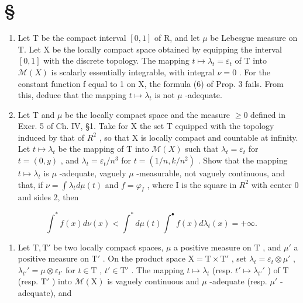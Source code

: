 \section*{\texorpdfstring{\S\CurrentExerciseGroup}{Section \CurrentExerciseGroup}}
{}

\begin{enumerate}
\def\labelenumi{\arabic{enumi})}
\item
  Let T be the compact interval \([0,1]\) of R, and let \(\mu\) be Lebesgue measure on T. Let X be the locally compact space obtained by equipping the interval \([0,1]\) with the discrete topology. The mapping \(t \mapsto \lambda_{t} = \varepsilon_{t}\) of T into \(\mathcal{M}(X)\) is scalarly essentially integrable, with integral \(\nu = 0\) . For the constant function f equal to 1 on X, the formula (6) of Prop. 3 fails. From this, deduce that the mapping \(t \mapsto \lambda_{t}\) is not \(\mu\) -adequate.
\item
  Let T and \(\mu\) be the locally compact space and the measure \(\geqslant 0\) defined in Exer. 5 of Ch. IV, §1. Take for X the set T equipped with the topology induced by that of \(R^{2}\) , so that X is locally compact and countable at infinity. Let \(t \mapsto \lambda_{t}\) be the mapping of T into \(\mathcal{M}(X)\) such that \(\lambda_{t} = \varepsilon_{t}\) for \(t = (0, y)\) , and \(\lambda_{t} = \varepsilon_{t}/n^{3}\) for \(t = (1/n, k/n^{2})\) . Show that the mapping \(t \mapsto \lambda_{t}\) is \(\mu\) -adequate, vaguely \(\mu\) -measurable, not vaguely continuous, and that, if \(\nu = \int \lambda_{t} d\mu(t)\) and \(f = \varphi_{I}\) , where I is the square in \(R^{2}\) with center 0 and sides 2, then
\end{enumerate}

\[
\int^ {*} f (x) d \nu (x) <   \int^ {*} d \mu (t) \int^ {\bullet} f (x) d \lambda_ {t} (x) = + \infty .
\]

\begin{enumerate}
\def\labelenumi{\arabic{enumi})}
\setcounter{enumi}{2}
\tightlist
\item
  Let \(\mathrm{T}, \mathrm{T}'\) be two locally compact spaces, \(\mu\) a positive measure on \(\mathrm{T}\) , and \(\mu'\) a positive measure on \(\mathrm{T}'\) . On the product space \(\mathrm{X} = \mathrm{T} \times \mathrm{T}'\) , set \(\lambda_t = \varepsilon_t \otimes \mu'\) , \(\lambda_{t'}' = \mu \otimes \varepsilon_{t'}\) for \(t \in \mathrm{T}\) , \(t' \in \mathrm{T}'\) . The mapping \(t \mapsto \lambda_t\) (resp. \(t' \mapsto \lambda_{t'}'\) ) of \(\mathrm{T}\) (resp. \(\mathrm{T}'\) ) into \(\mathcal{M}(\mathrm{X})\) is vaguely continuous and \(\mu\) -adequate (resp. \(\mu'\) -adequate), and
\end{enumerate}

